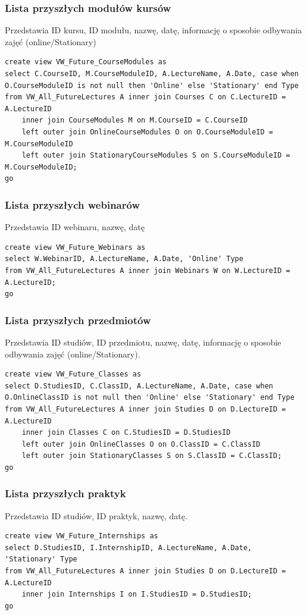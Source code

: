 \documentclass[11pt,a4paper]{article}
\begin{document}
\subsubsection{Lista przyszłych modułów kursów}
Przedstawia ID kursu, ID modułu, nazwę, datę, informację o sposobie odbywania zajęć (online/Stationary)
\begin{Verbatim}[breaklines=true]
create view VW_Future_CourseModules as
select C.CourseID, M.CourseModuleID, A.LectureName, A.Date, case when O.CourseModuleID is not null then 'Online' else 'Stationary' end Type
from VW_All_FutureLectures A inner join Courses C on C.LectureID = A.LectureID
    inner join CourseModules M on M.CourseID = C.CourseID
    left outer join OnlineCourseModules O on O.CourseModuleID = M.CourseModuleID
    left outer join StationaryCourseModules S on S.CourseModuleID = M.CourseModuleID;
go
\end{Verbatim}

\subsubsection{Lista przyszłych webinarów}
Przedstawia ID webinaru, nazwę, datę 
\begin{Verbatim}[breaklines=true]
create view VW_Future_Webinars as
select W.WebinarID, A.LectureName, A.Date, 'Online' Type
from VW_All_FutureLectures A inner join Webinars W on W.LectureID = A.LectureID;
go
\end{Verbatim}

\subsubsection{Lista przyszłych przedmiotów}
Przedstawia ID studiów, ID przedmiotu, nazwę, datę, 
informację o sposobie odbywania zajęć (online/Stationary).
\begin{Verbatim}[breaklines=true]
create view VW_Future_Classes as
select D.StudiesID, C.ClassID, A.LectureName, A.Date, case when O.OnlineClassID is not null then 'Online' else 'Stationary' end Type
from VW_All_FutureLectures A inner join Studies D on D.LectureID = A.LectureID
    inner join Classes C on C.StudiesID = D.StudiesID
    left outer join OnlineClasses O on O.ClassID = C.ClassID
    left outer join StationaryClasses S on S.ClassID = C.ClassID;
go
\end{Verbatim}
\subsubsection{Lista przyszłych praktyk}
Przedstawia ID studiów, ID praktyk, nazwę, datę.
\begin{Verbatim}[breaklines=true]
create view VW_Future_Internships as
select D.StudiesID, I.InternshipID, A.LectureName, A.Date, 'Stationary' Type
from VW_All_FutureLectures A inner join Studies D on D.LectureID = A.LectureID
    inner join Internships I on I.StudiesID = D.StudiesID;
go
\end{Verbatim}
\end{document}
